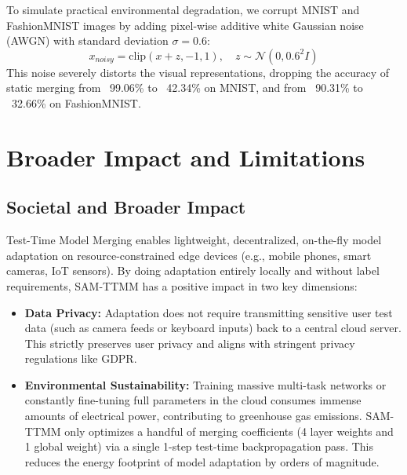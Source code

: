 \documentclass{article}
\theoremstyle{plain}
\theoremstyle{definition}
\theoremstyle{remark}
\begin{document}
To simulate practical environmental degradation, we corrupt MNIST and FashionMNIST images by adding pixel-wise additive white Gaussian noise (AWGN) with standard deviation $\sigma = 0.6$:
\begin{equation}
    x_{noisy} = \text{clip}(x + z, -1, 1), \quad z \sim \mathcal{N}(0, 0.6^2 I)
\end{equation}
This noise severely distorts the visual representations, dropping the accuracy of static merging from ~99.06\% to ~42.34\% on MNIST, and from ~90.31\% to ~32.66\% on FashionMNIST.

\section{Broader Impact and Limitations}
\label{app:impact}

\subsection{Societal and Broader Impact}
Test-Time Model Merging enables lightweight, decentralized, on-the-fly model adaptation on resource-constrained edge devices (e.g., mobile phones, smart cameras, IoT sensors). By doing adaptation entirely locally and without label requirements, SAM-TTMM has a positive impact in two key dimensions:
\begin{itemize}
    \item \textbf{Data Privacy:} Adaptation does not require transmitting sensitive user test data (such as camera feeds or keyboard inputs) back to a central cloud server. This strictly preserves user privacy and aligns with stringent privacy regulations like GDPR.
    \item \textbf{Environmental Sustainability:} Training massive multi-task networks or constantly fine-tuning full parameters in the cloud consumes immense amounts of electrical power, contributing to greenhouse gas emissions. SAM-TTMM only optimizes a handful of merging coefficients (4 layer weights and 1 global weight) via a single 1-step test-time backpropagation pass. This reduces the energy footprint of model adaptation by orders of magnitude.
\end{itemize}
\end{document}
